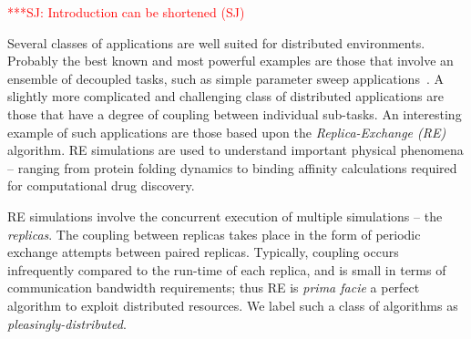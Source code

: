 \documentclass{rspublic}
\newcommand{\alnote}[1]{ {\textcolor{blue} { ***AL: #1 }}}
\newcommand{\jhanote}[1]{ {\textcolor{red} { ***SJ: #1 }}}
\newcommand{\alnote}[1]{}
\newcommand{\jhanote}[1]{}
\begin{document}

\jhanote{Introduction can be shortened (SJ)}

Several classes of applications are well suited for distributed
environments. Probably the best known and most powerful examples are
those that involve an ensemble of decoupled tasks, such as simple
parameter sweep applications~\citep{1239909}. %
A slightly more complicated and challenging
class of distributed applications are those that have a degree of
coupling between individual sub-tasks.  An interesting example of such
applications are those based upon the \emph{Replica-Exchange
  (RE)}~\citep{hansmann,Sugita:1999rm} algorithm. %
RE
simulations are used to understand important physical phenomena --
ranging from protein folding dynamics to binding affinity calculations
required for computational drug discovery.
  
RE simulations involve the concurrent execution of multiple
simulations -- the \emph{replicas}. The coupling between replicas
takes place in the form of periodic exchange attempts between paired
replicas. Typically, coupling occurs infrequently compared to the
run-time of each replica, and is small in terms of communication
bandwidth requirements; thus RE is {\it prima facie} a perfect
algorithm to exploit distributed resources. We label such a class of
algorithms as {\it pleasingly-distributed}.

\end{document}
